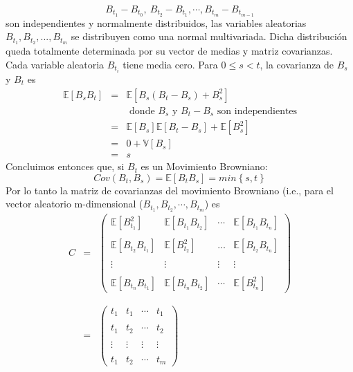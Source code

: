\documentclass[11pt,notitlepage]{article}
\begin{document}
\begin{equation*}
 B_{t_1}-B_{t_0}, \ B_{t_2}-B_{t_1}, \cdots, B_{t_m}-B_{t_{m-1}} 
\end{equation*}
son independientes y normalmente distribuidos, las variables aleatorias $B_{t_1},B_{t_2},...,B_{t_m}$  se distribuyen como una normal multivariada. Dicha distribución queda totalmente determinada por su vector de medias y matriz covarianzas. Cada variable aleatoria $B_{t_i}$ tiene media cero. Para $0 \leq s < t$, la covarianza de $B_s$ y $B_t$ es
\begin{eqnarray*}
    \mathbb{E} \left[ B_sB_t\right] &=& \mathbb{E} \left[ B_s(B_t - B_s) + B_{s}^2\right] \\
    && \text{ donde $B_s$ y $B_t-B_s$ son independientes} \\
    &=& \mathbb{E} \left[B_s\right] \mathbb{E} \left[B_t- B_s\right] + \mathbb{E} \left[B_{s}^2\right] \\
    &=& 0 + \mathbb{V}[B_s] \\
    &=& s
\end{eqnarray*}
Concluimos entonces que, si \(B_t\) es un Movimiento Browniano:
\[Cov(B_t,B_s)=\mathbb{E}[B_tB_s]=min\left \{ s,t \right \}\]
Por lo tanto la matriz de covarianzas del movimiento Browniano (i.e., para el vector aleatorio m-dimensional ($B_{t_1}, B_{t_2}, \cdots, B_{t_m} $) es
\begin{eqnarray*}
C &=& \left( \begin{array}{cccc}
\mathbb{E}\left[ B^2_{t_1} \right] & \mathbb{E}\left[ B_{t_1} B_{t_2} \right] & \cdots &  \mathbb{E}\left[ B_{t_1} B_{t_n} \right] \\ \\
\mathbb{E}\left[ B_{t_2} B_{t_1} \right] & \mathbb{E}\left[ B^2_{t_2} \right] & \dots & \mathbb{E}\left[ B_{t_2} B_{t_n} \right] \\ \\
\vdots & \vdots & \vdots & \vdots \\ \\
 \mathbb{E}\left[ B_{t_n} B_{t_1} \right]  &  \mathbb{E}\left[ B_{t_n} B_{t_2} \right]  & \cdots & \mathbb{E}\left[ B^2_{t_n} \right] \end{array} \right) \\ \\ \\
 &=&  \left(  
\begin{array}{cccc}
    t_1 & t_1 & \cdots & t_1  \\ \\
    t_1 & t_2 & \cdots & t_2 \\ \\
    \vdots & \vdots & \vdots & \vdots \\ \\
    t_1 & t_2 & \cdots & t_m
\end{array}
\right)
\end{eqnarray*}
\end{document}
